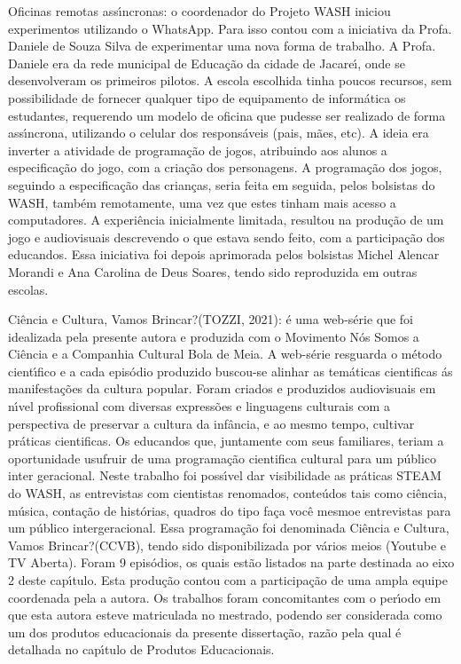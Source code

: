\documentclass[
12pt,		%
openright,	%
twoside,  %
a4paper,			%
chapter=TITLE,		%
english,			%
french,				%
spanish,			%
brazil				%
]{USPSC-classe/USPSC}
\begin{document}
\begin{alineas}
\item Oficinas remotas ass\'{\i}ncronas: o coordenador do Projeto WASH iniciou experimentos utilizando o WhatsApp. Para isso contou com a iniciativa da Profa. Daniele de Souza Silva de experimentar uma nova forma de trabalho. A Profa. Daniele era da rede municipal de Educa\c{c}\~ao da cidade de Jacare\'{\i}, onde se desenvolveram os primeiros pilotos. A escola escolhida tinha poucos recursos, sem possibilidade de fornecer qualquer tipo de equipamento de inform\'atica os estudantes, requerendo um modelo de oficina que pudesse ser realizado de forma ass\'{\i}ncrona, utilizando o celular dos respons\'aveis (pais, m\~aes, etc). A ideia era inverter a atividade de programa\c{c}\~ao de jogos, atribuindo aos alunos a especifica\c{c}\~ao do jogo, com a cria\c{c}\~ao dos personagens. A programa\c{c}\~ao dos jogos, seguindo a especifica\c{c}\~ao das crian\c{c}as, seria feita em seguida, pelos bolsistas do WASH, tamb\'em remotamente, uma vez que estes tinham mais acesso a computadores. A experi\^encia inicialmente limitada, resultou na produ\c{c}\~ao de um jogo e audiovisuais descrevendo o que estava sendo feito, com a participa\c{c}\~ao dos educandos. Essa iniciativa foi depois aprimorada pelos bolsistas Michel Alencar Morandi e Ana Carolina de Deus Soares, tendo sido reproduzida em outras escolas.
\item \textquotedbl Ci\^encia e Cultura, Vamos Brincar?\textquotedbl   (TOZZI, 2021): \'e uma web-s\'erie que foi idealizada pela  presente autora e produzida com o Movimento N\'os Somos a Ci\^encia e a Companhia Cultural Bola de Meia. A web-s\'erie resguarda o m\'etodo cient\'{\i}fico e a cada epis\'odio produzido buscou-se alinhar as tem\'aticas cientificas \'as manifesta\c{c}\~oes  da cultura popular.  Foram criados e produzidos audiovisuais em n\'{\i}vel profissional com diversas express\~oes e linguagens culturais  com a perspectiva de preservar a cultura da inf\^ancia, e ao mesmo tempo,  cultivar pr\'aticas cientificas.  Os educandos que, juntamente com seus familiares, teriam a oportunidade usufruir de uma programa\c{c}\~ao cientifica cultural para um p\'ublico 
inter geracional. Neste trabalho foi poss\'{\i}vel dar visibilidade as pr\'aticas STEAM do WASH,  as entrevistas com cientistas renomados, conte\'udos tais como ci\^encia, m\'usica, conta\c{c}\~ao de hist\'orias, quadros do tipo \textquotedbl fa\c{c}a voc\^e mesmo\textquotedbl  e entrevistas para um p\'ublico intergeracional.  Essa programa\c{c}\~ao foi denominada \textquotedbl Ci\^encia e Cultura, Vamos Brincar?\textquotedbl  (CCVB), tendo sido disponibilizada por v\'arios meios (Youtube e TV Aberta). Foram 9 epis\'odios, os quais est\~ao listados na parte destinada ao eixo 2 deste cap\'{\i}tulo. Esta produ\c{c}\~ao contou com a participa\c{c}\~ao de uma ampla equipe coordenada pela a autora. Os trabalhos foram concomitantes com o per\'{\i}odo em que esta autora esteve matriculada no mestrado, podendo ser considerada como um dos produtos educacionais da presente disserta\c{c}\~ao, raz\~ao pela qual \'e detalhada no cap\'{\i}tulo de Produtos Educacionais.
\end{alineas}
\end{document}
